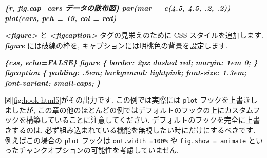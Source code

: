 \documentclass[
  11pt,
]{bxjsreport}
\newenvironment{Shaded}{\begin{snugshade}}{\end{snugshade}}
\newcommand{\InformationTok}[1]{\textcolor[rgb]{0.56,0.35,0.01}{\textbf{\textit{#1}}}}
\newcommand{\NormalTok}[1]{#1}
\begin{document}
\begin{Shaded}
\begin{Highlighting}[]
\InformationTok{\textasciigrave{}\textasciigrave{}\textasciigrave{}\{r, fig.cap=\textquotesingle{}cars データの散布図\textquotesingle{}\}}
\InformationTok{par(mar = c(4.5, 4.5, .2, .2))}
\InformationTok{plot(cars, pch = 19, col = \textquotesingle{}red\textquotesingle{})}
\InformationTok{\textasciigrave{}\textasciigrave{}\textasciigrave{}}

\InformationTok{\textasciigrave{}\textless{}figure\textgreater{}\textasciigrave{}}\NormalTok{ と }\InformationTok{\textasciigrave{}\textless{}figcaption\textgreater{}\textasciigrave{}}\NormalTok{ タグの見栄えのために CSS スタイルを追加します. }\InformationTok{\textasciigrave{}figure\textasciigrave{}}\NormalTok{ には破線の枠を, キャプションには明桃色の背景を設定します.}

\InformationTok{\textasciigrave{}\textasciigrave{}\textasciigrave{}\{css, echo=FALSE\}}
\InformationTok{figure \{}
\InformationTok{  border: 2px dashed red;}
\InformationTok{  margin: 1em 0;}
\InformationTok{\}}
\InformationTok{figcaption \{}
\InformationTok{  padding: .5em;}
\InformationTok{  background: lightpink;}
\InformationTok{  font{-}size: 1.3em;}
\InformationTok{  font{-}variant: small{-}caps;}
\InformationTok{\}}
\InformationTok{\textasciigrave{}\textasciigrave{}\textasciigrave{}}
\end{Highlighting}
\end{Shaded}

図\ref{fig:hook-html5}がその出力です. この例では実際には \texttt{plot} フックを上書きしましたが, この章の他のほとんどの例ではデフォルトのフックの上にカスタムフックを構築していることに注意してください. デフォルトのフックを完全に上書きするのは, 必ず組み込まれている機能を無視したい時にだけにするべきです. 例えばこの場合の \texttt{plot} フックは \texttt{out.width =\textquotesingle{}100\%\textquotesingle{}} や \texttt{fig.show = \textquotesingle{}animate\textquotesingle{}} といったチャンクオプションの可能性を考慮していません.
\end{document}
